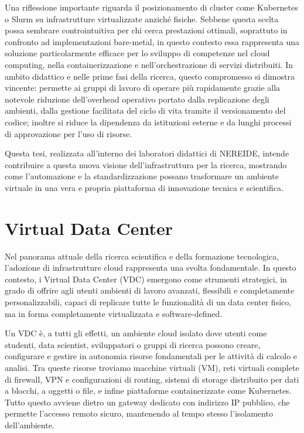 \documentclass[12pt,a4paper,openright,twoside]{book}
\begin{document}
Una riflessione importante riguarda il posizionamento di cluster come Kubernetes o Slurm su infrastrutture virtualizzate anziché fisiche.
Sebbene questa scelta possa sembrare controintuitiva per chi cerca prestazioni ottimali, soprattuto in confronto ad implementazioni bare-metal,
in questo contesto essa rappresenta una soluzione particolarmente efficace per lo sviluppo di competenze nel cloud computing, nella containerizzazione e 
nell'orchestrazione di servizi distribuiti.
In ambito didattico e nelle prime fasi della ricerca, questo compromesso si dimostra vincente: permette ai gruppi di lavoro di operare più rapidamente grazie
alla notevole riduzione dell'overhead operativo portato dalla replicazione degli ambienti, dalla gestione facilitata del ciclo di vita tramite il versionamento del 
codice; inoltre si riduce la dipendenza da istituzioni esterne e da lunghi processi di approvazione per l'uso di risorse.

Questa tesi, realizzata all'interno dei laboratori didattici di NEREIDE, intende contribuire a questa nuova visione dell'infrastruttura per la ricerca,
mostrando come l'automazione e la standardizzazione possano trasformare un ambiente virtuale in una vera e propria piattaforma di innovazione tecnica e scientifica.

\section{Virtual Data Center}
\label{sec:vdc}
Nel panorama attuale della ricerca scientifica e della formazione tecnologica, l'adozione di infrastrutture cloud rappresenta una svolta fondamentale.
In questo contesto, i Virtual Data Center (VDC) emergono come strumenti strategici, in grado di offrire agli utenti ambienti di lavoro avanzati,
flessibili e completamente personalizzabili, capaci di replicare tutte le funzionalità di un data center fisico, ma in forma completamente virtualizzata e software-defined.

Un VDC è, a tutti gli effetti, un ambiente cloud isolato dove utenti come studenti, data scientist, sviluppatori o gruppi di ricerca possono creare,
configurare e gestire in autonomia risorse fondamentali per le attività di calcolo e analisi.
Tra queste risorse troviamo macchine virtuali (VM), reti virtuali complete di firewall, VPN e configurazioni di routing, sistemi di storage distribuito per dati a blocchi,
a oggetti o file, e infine piattaforme containerizzate come Kubernetes. Tutto questo avviene dietro un gateway dedicato con indirizzo IP pubblico, che permette l'accesso remoto sicuro, mantenendo al tempo stesso l'isolamento dell'ambiente.
\end{document}
